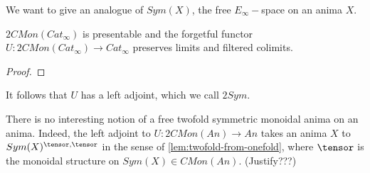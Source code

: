 We want to give an analogue of $Sym(X)$, the free $E_\infty-$space on an anima $X.$


\begin{prop}
    $2CMon(Cat_\infty)$ is presentable and the forgetful functor $U:2CMon(Cat_\infty)\rightarrow Cat_\infty$ preserves limits and filtered colimits.
\end{prop}
\begin{proof}
    
\end{proof}

It follows that $U$ has a left adjoint, which we call $2Sym$.

\begin{remark}
    There is no interesting notion of a free twofold symmetric monoidal anima on an anima. Indeed, the left adjoint to $U:2CMon(An)\rightarrow An$ takes an anima $X$ to $Sym(X)^{\tensor,\tensor}$ in the sense of \cref{lem:twofold-from-onefold}, where $\tensor$ is the monoidal structure on $Sym(X)\in CMon(An)$. (Justify???)
\end{remark}